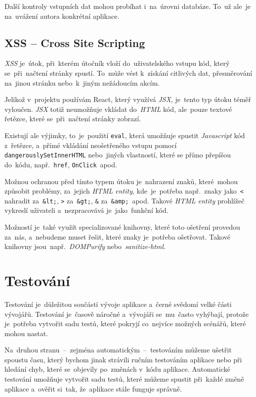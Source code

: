 \documentclass[11pt,a4paper]{report}
\begin{document}
                Další kontroly vstupních dat mohou probíhat i~na~úrovni databáze. To~už ale~je na~uvážení autora konkrétní aplikace. \cite{w3s:SQLInjection, itnetwork:SQLInjection}

            \subsection{XSS -- Cross Site Scripting}
                \emph{XSS} je~útok, při~kterém útočník vloží do~uživatelského vstupu kód, který se~při~načtení stránky spustí. To~může vést k~získání citlivých dat, přesměrování na~jinou stránku nebo~k~jiným nežádoucím akcím.

                Jelikož v~projektu používám React, který využívá \emph{JSX}, je~tento typ útoku téměř vyloučen. \emph{JSX} totiž neumožňuje vkládat do~\emph{HTML} kód, ale~pouze textové řetězce, které se~při~načtení stránky zobrazí.

                Existují ale výjimky, to~je~použití \texttt{eval}, která umožňuje spustit \emph{Javascript} kód z~řetězce, a~přímé vkládání neošetřeného vstupu pomocí \texttt{dangerouslySetInnerHTML} nebo~jiných vlastností, které se přímo přepíšou do~kódu, např.~\texttt{href}, \texttt{OnClick}~apod.

                Možnou ochranou před tímto typem útoku je~nahrazení znaků, které~mohou způsobit problémy, za~jejich \emph{HTML entity}, kde~je~potřeba např.~znaky jako~\texttt{<} nahradit za~\texttt{\&lt;}, \texttt{>} za~\texttt{\&gt;}, \texttt{\&} za~\texttt{\&amp;}~apod. Takové \emph{HTML entity} prohlížeč vykreslí uživateli a~nezpracovává je~jako~funkční kód.
                
                Možností je~také využít specializované knihovny, které toto ošetření provedou za~nás, a~nebudeme muset řešit, které znaky je~potřeba ošetřovat. Takové knihovny jsou~např.~\emph{DOMPurify} nebo~\emph{sanitize-html}. \cite{medium:XSS}

        \section{Testování}
            Testování je~důležitou součástí vývoje aplikace a~černé svědomí velké části vývojářů. Testování je~časově náročné a~vývojáři se~mu~často vyhýbají, protože je~potřeba vytvořit sadu testů, které pokryjí co~nejvíce možných scénářů, které mohou nastat.
            
            Na~druhou stranu~--~zejména automatickým~--~testováním můžeme ušetřit spoustu času, který bychom jinak strávili ručním testováním aplikace nebo při hledání chyb, které se~objevily po~změnách v~kódu aplikace. Automatické testování umožňuje vytvořit sadu testů, které můžeme spustit při~každé změně aplikace a~ověřit si~tak, že~aplikace stále funguje správně.
            
\end{document}
